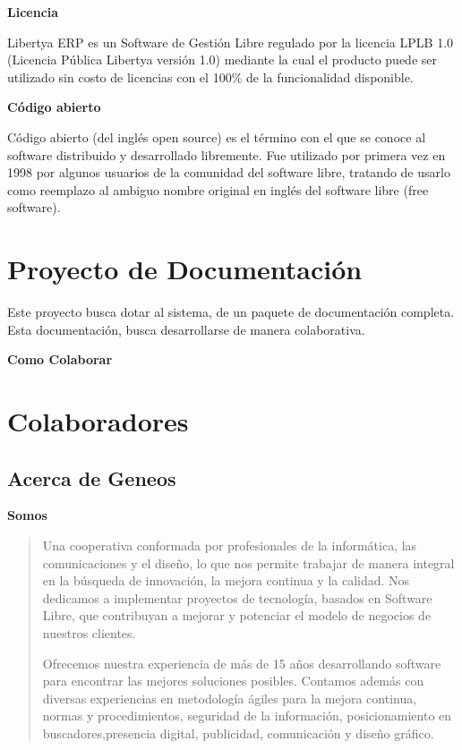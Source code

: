 \documentclass[letterpaper,10pt,spanish]{sphinxmanual}
\begin{document}
\textbf{Licencia}

Libertya ERP es un Software de Gestión Libre regulado por la licencia LPLB 1.0 (Licencia Pública Libertya versión 1.0) mediante la cual el producto puede ser utilizado sin costo de licencias con el 100\% de la funcionalidad disponible.

\textbf{Código abierto}

Código abierto (del inglés open source) es el término con el que se conoce al software distribuido y desarrollado libremente. Fue utilizado por primera vez en 1998 por algunos usuarios de la comunidad del software libre, tratando de usarlo como reemplazo al ambiguo nombre original en inglés del software libre (free software).


\section{Proyecto de Documentación}
\label{all-about-me:proyecto-de-documentacion}
Este proyecto busca dotar al sistema, de un paquete de documentación completa. Esta documentación, busca desarrollarse de manera colaborativa.

\textbf{Como Colaborar}


\section{Colaboradores}
\label{all-about-me:colaboradores}

\subsection{Acerca de Geneos}
\label{all-about-geneos:acerca-de-geneos}\label{all-about-geneos::doc}
\textbf{Somos}
\begin{quote}

Una cooperativa conformada por profesionales de la informática, las comunicaciones y el diseño, lo que nos permite trabajar de manera integral en la búsqueda de innovación, la mejora continua y la calidad. Nos dedicamos a implementar proyectos de tecnología, basados en Software Libre, que contribuyan a mejorar y potenciar el modelo de negocios de nuestros clientes.

Ofrecemos nuestra experiencia de más de 15 años desarrollando software para encontrar las mejores soluciones posibles. Contamos además con diversas experiencias en metodología ágiles para la mejora continua, normas y procedimientos, seguridad de la información, posicionamiento en buscadores,presencia digital, publicidad, comunicación y diseño gráfico.
\end{quote}
\end{document}
